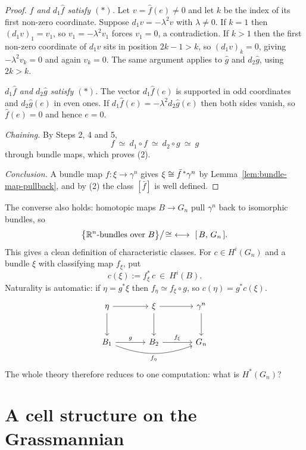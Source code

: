 \begin{proof}
 \emph{$\hat f$ and $d_1\hat f$ satisfy $(\ast)$.} Let $v=\hat f(e)\neq0$
and let $k$ be the index of its first non-zero coordinate. Suppose
$d_1v=-\lambda^2 v$ with $\lambda\neq0$. If $k=1$ then $(d_1v)_1=v_1$, so
$v_1=-\lambda^2v_1$ forces $v_1=0$, a contradiction. If $k>1$ then the first
non-zero coordinate of $d_1v$ sits in position $2k-1>k$, so $(d_1v)_k=0$, giving
$-\lambda^2v_k=0$ and again $v_k=0$. The same argument applies to $\hat g$ and
$d_2\hat g$, using $2k>k$.

 \emph{$d_1\hat f$ and $d_2\hat g$ satisfy $(\ast)$.} The vector
$d_1\hat f(e)$ is supported in odd coordinates and $d_2\hat g(e)$ in even ones.
If $d_1\hat f(e)=-\lambda^2d_2\hat g(e)$ then both sides vanish, so
$\hat f(e)=0$ and hence $e=0$.

 \emph{Chaining.} By Steps 2, 4 and 5,
\[
f\ \simeq\ d_1\circ f\ \simeq\ d_2\circ g\ \simeq\ g
\]
through bundle maps, which proves (2).

 \emph{Conclusion.} A bundle map $f\colon\xi\to\gamma^n$ gives
$\xi\cong\bar f^{\,*}\gamma^n$ by Lemma~\ref{lem:bundle-map-pullback}, and by (2)
the class $[\bar f]$ is well defined.
\end{proof}

\begin{remark}
The converse also holds: homotopic maps $B\to G_n$ pull $\gamma^n$ back to
isomorphic bundles, so
\[
\big\{\mathbb{R}^n\text{-bundles over }B\big\}\big/\!\cong
\ \longleftrightarrow\
[\,B,\,G_n\,].
\]
This gives a clean definition of characteristic classes. For
$c\in H^i(G_n)$ and a bundle $\xi$ with classifying map $f_\xi$, put
\[
c(\xi):=f_\xi^*\,c\ \in\ H^i(B).
\]
Naturality is automatic: if $\eta=g^*\xi$ then $f_\eta\simeq f_\xi\circ g$, so
$c(\eta)=g^*c(\xi)$.
\[
\begin{tikzcd}[row sep=large, column sep=large]
\eta \arrow[d] \arrow[r] & \xi \arrow[d] \arrow[r] & \gamma^n\arrow[d]\\
B_1 \arrow[r,"g"] \arrow[rr, bend right=20, "f_\eta"'] & B_2 \arrow[r,"f_\xi"] & G_n
\end{tikzcd}
\]
The whole theory therefore reduces to one computation: what is $H^*(G_n)$?
\end{remark}

\section{A cell structure on the Grassmannian}

